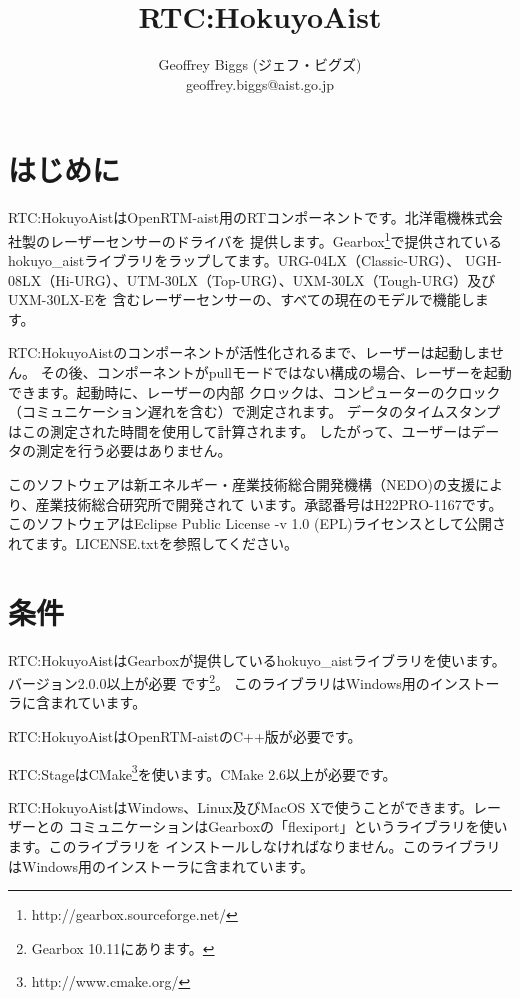 \documentclass[a4paper,10pt]{article}
\title{RTC:HokuyoAist}
\author{Geoffrey Biggs (ジェフ・ビグズ)\\
geoffrey.biggs@aist.go.jp}
\newenvironment{Japanese}{%
  \CJKfamily{min}%
  \CJKtilde
  \CJKnospace}{}
\begin{document}
\begin{CJK}{UTF8}{}
\begin{Japanese}

\maketitle

\section{はじめに}
\label{sec:intro}

RTC:HokuyoAistはOpenRTM-aist用のRTコンポーネントです。北洋電機株式会社製のレーザーセンサーのドライバを
提供します。Gearbox\footnote{http://gearbox.sourceforge.net/}で提供されているhokuyo\_aistライブラリをラップしてます。URG-04LX（Classic-URG）、
UGH-08LX（Hi-URG）、UTM-30LX（Top-URG）、UXM-30LX（Tough-URG）及びUXM-30LX-Eを
含むレーザーセンサーの、すべての現在のモデルで機能します。

RTC:HokuyoAistのコンポーネントが活性化されるまで、レーザーは起動しません。
その後、コンポーネントがpullモードではない構成の場合、レーザーを起動できます。起動時に、レーザーの内部
クロックは、コンピューターのクロック（コミュニケーション遅れを含む）で測定されます。
データのタイムスタンプはこの測定された時間を使用して計算されます。
したがって、ユーザーはデータの測定を行う必要はありません。

このソフトウェアは新エネルギー・産業技術総合開発機構（NEDO)の支援により、産業技術総合研究所で開発されて
います。承認番号はH22PRO-1167です。
このソフトウェアはEclipse Public License -v 1.0 (EPL)ライセンスとして公開されてます。LICENSE.txtを参照してください。

\section{条件}
\label{sec:requirements}

RTC:HokuyoAistはGearboxが提供しているhokuyo\_aistライブラリを使います。バージョン2.0.0以上が必要
です\footnote{Gearbox 10.11にあります。}。
このライブラリはWindows用のインストーラに含まれています。

RTC:HokuyoAistはOpenRTM-aistのC++版が必要です。

RTC:StageはCMake\footnote{http://www.cmake.org/}を使います。CMake
2.6以上が必要です。

RTC:HokuyoAistはWindows、Linux及びMacOS Xで使うことができます。レーザーとの
コミュニケーションはGearboxの「flexiport」というライブラリを使います。このライブラリを
インストールしなければなりません。このライブラリはWindows用のインストーラに含まれています。


\end{Japanese}
\end{CJK}
\end{document}
